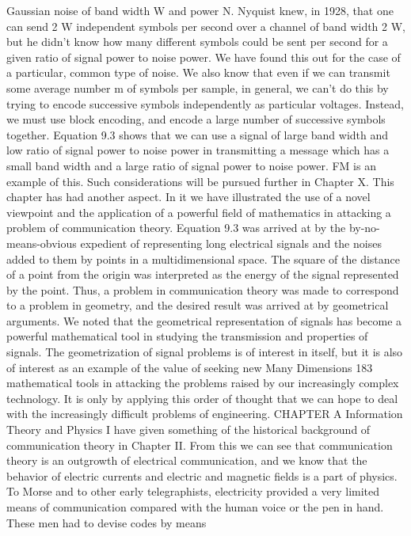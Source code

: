 {{{{{{{{{{{Gaussian noise of band width W and power N.
Nyquist knew, in 1928, that one can send 2 W independent
symbols per second over a channel of band width 2 W, but he didn’t
know how many different symbols could be sent per second for a
given ratio of signal power to noise power. We have found this out
for the case of a particular, common type of noise. We also know
that even if we can transmit some average number m of symbols
per sample, in general, we can’t do this by trying to encode successive
symbols independently as particular voltages. Instead, we
must use block encoding, and encode a large number of successive
symbols together.
Equation 9.3 shows that we can use a signal of large band width
and low ratio of signal power to noise power in transmitting a
message which has a small band width and a large ratio of signal
power to noise power. FM is an example of this. Such considerations
will be pursued further in Chapter X.
This chapter has had another aspect. In it we have illustrated
the use of a novel viewpoint and the application of a powerful field
of mathematics in attacking a problem of communication theory.
Equation 9.3 was arrived at by the by-no-means-obvious expedient
of representing long electrical signals and the noises added to them
by points in a multidimensional space. The square of the distance
of a point from the origin was interpreted as the energy of the
signal represented by the point.
Thus, a problem in communication theory was made to correspond
to a problem in geometry, and the desired result was arrived
at by geometrical arguments. We noted that the geometrical representation
of signals has become a powerful mathematical tool in
studying the transmission and properties of signals.
The geometrization of signal problems is of interest in itself, but
it is also of interest as an example of the value of seeking new
Many Dimensions
183
mathematical tools in attacking the problems raised by our increasingly
complex technology. It is only by applying this order of
thought that we can hope to deal with the increasingly difficult
problems of engineering.
CHAPTER A Information Theory
and Physics
I have given something of the historical background of communication
theory in Chapter II. From this we can see that
communication theory is an outgrowth of electrical communication,
and we know that the behavior of electric currents and
electric and magnetic fields is a part of physics.
To Morse and to other early telegraphists, electricity provided
a very limited means of communication compared with the human
voice or the pen in hand. These men had to devise codes by means
}}}}}}}}}}}
